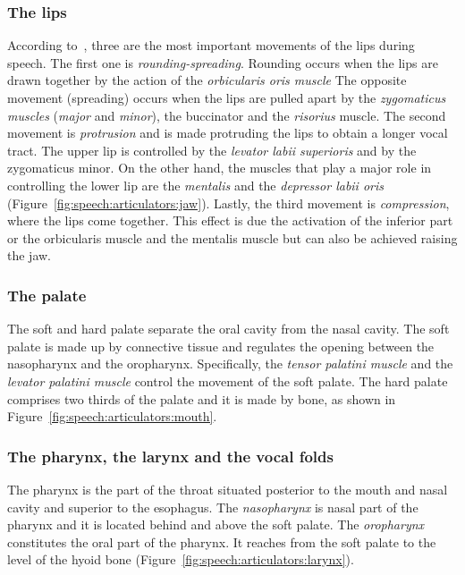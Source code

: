 \subsubsection{The lips}
According to~\citet{epstein.etal:2002}, three are the most important movements
of the lips during speech.
The first one is \emph{rounding-spreading}. Rounding occurs when the lips are
drawn together by the action of the \emph{orbicularis oris muscle}
The opposite movement (spreading) occurs when the lips are pulled apart by the
\emph{zygomaticus muscles} (\emph{major} and \emph{minor}), the buccinator and
the \emph{risorius} muscle.
The second movement is \emph{protrusion} and is made protruding the lips to
obtain a longer vocal tract.
The upper lip is controlled by the \emph{levator labii superioris} and by the
zygomaticus minor. On the other hand, the muscles that play a major role in
controlling the lower lip are the \emph{mentalis} and the \emph{depressor
labii oris} (Figure~\ref{fig:speech:articulators:jaw}).
Lastly, the third movement is \emph{compression}, where the lips come together. 
This effect is due the activation of the inferior part or the orbicularis muscle
and the mentalis muscle but can also be achieved raising the jaw.
\subsubsection{The palate}
The soft and hard palate separate the oral cavity from the nasal cavity.
The soft palate is made up by connective tissue and regulates the opening
between the nasopharynx  and the oropharynx.
Specifically, the \emph{tensor palatini muscle} and the \emph{levator palatini
muscle} control the movement of the soft palate.
The hard palate comprises two thirds of the palate and it is made by bone,
as shown in Figure~\ref{fig:speech:articulators:mouth}.

\subsubsection{The pharynx, the larynx and the vocal folds}
The pharynx is the part of the throat situated posterior to the mouth and nasal
cavity and superior to the esophagus.
The \emph{nasopharynx} is nasal part of the pharynx and it is located behind 
and above the soft palate.
The \emph{oropharynx} constitutes the oral part of the pharynx. It
reaches from the soft palate to the level of the hyoid bone
(Figure~\ref{fig:speech:articulators:larynx}).

